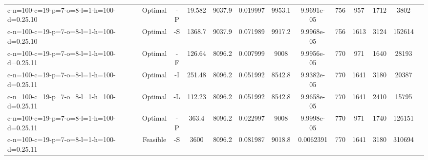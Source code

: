 \documentclass[landscape, a4paper]{article}
\begin{document}
\begin{center}
\begin{tabular}{lcccccccccccc}
c-n=100-c=19-p=7-o=8-l=1-h=100-d=0.25.10 & Optimal & -P & 19.582 & 9037.9 & 0.019997 & 9953.1 & 9.9691e-05 & 756 & 957 & 1712 & 3802 & \\
c-n=100-c=19-p=7-o=8-l=1-h=100-d=0.25.10 & Optimal & -S & 1368.7 & 9037.9 & 0.071989 & 9917.2 & 9.9968e-05 & 756 & 1613 & 3124 & 152614 & \\
c-n=100-c=19-p=7-o=8-l=1-h=100-d=0.25.11 & Optimal & -F & 126.64 & 8096.2 & 0.007999 & 9008 & 9.9956e-05 & 770 & 971 & 1640 & 28193 & \\
c-n=100-c=19-p=7-o=8-l=1-h=100-d=0.25.11 & Optimal & -I & 251.48 & 8096.2 & 0.051992 & 8542.8 & 9.9382e-05 & 770 & 1641 & 3180 & 20387 & \\
c-n=100-c=19-p=7-o=8-l=1-h=100-d=0.25.11 & Optimal & -L & 112.23 & 8096.2 & 0.051992 & 8542.8 & 9.9658e-05 & 770 & 1641 & 2410 & 15795 & \\
c-n=100-c=19-p=7-o=8-l=1-h=100-d=0.25.11 & Optimal & -P & 363.4 & 8096.2 & 0.022997 & 9008 & 9.9998e-05 & 770 & 971 & 1740 & 126151 & \\
c-n=100-c=19-p=7-o=8-l=1-h=100-d=0.25.11 & Feasible & -S & 3600 & 8096.2 & 0.081987 & 9018.8 & 0.0062391 & 770 & 1641 & 3180 & 310694 & \\
\end{tabular}
\end{center}
\end{document}
